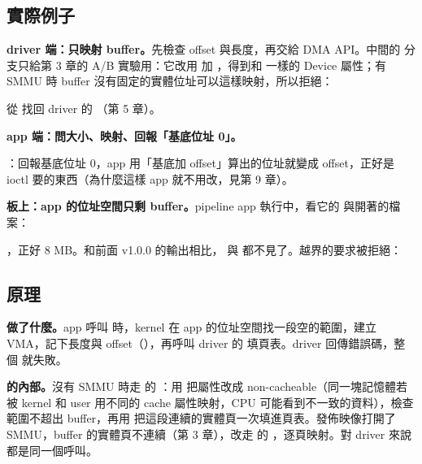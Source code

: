 \subsection{實際例子}

\textbf{driver 端：只映射 buffer。}先檢查 offset 與長度，再交給 DMA API。中間的  分支只給第 3 章的 A/B 實驗用：它改用  加 ，得到和  一樣的 Device 屬性；有 SMMU 時 buffer 沒有固定的實體位址可以這樣映射，所以拒絕：


 從  找回 driver 的 （第 5 章）。

\textbf{app 端：問大小、映射、回報「基底位址 0」。}


：回報基底位址 0，app 用「基底加 offset」算出的位址就變成 offset，正好是 ioctl 要的東西（為什麼這樣 app 就不用改，見第 9 章）。

\textbf{板上：app 的位址空間只剩 buffer。}pipeline app 執行中，看它的  與開著的檔案：


，正好 8 MB。和前面 v1.0.0 的輸出相比， 與  都不見了。越界的要求被拒絕：


\subsection{原理}

\textbf{ 做了什麼。}app 呼叫  時，kernel 在 app 的位址空間找一段空的範圍，建立 VMA，記下長度與 offset（），再呼叫 driver 的  填頁表。driver 回傳錯誤碼，整個  就失敗。

\textbf{ 的內部。}沒有 SMMU 時走  的 ：用  把屬性改成 non-cacheable（同一塊記憶體若被 kernel 和 user 用不同的 cache 屬性映射，CPU 可能看到不一致的資料），檢查範圍不超出 buffer，再用  把這段連續的實體頁一次填進頁表。發佈映像打開了 SMMU，buffer 的實體頁不連續（第 3 章），改走  的 ，逐頁映射。對 driver 來說都是同一個呼叫。

